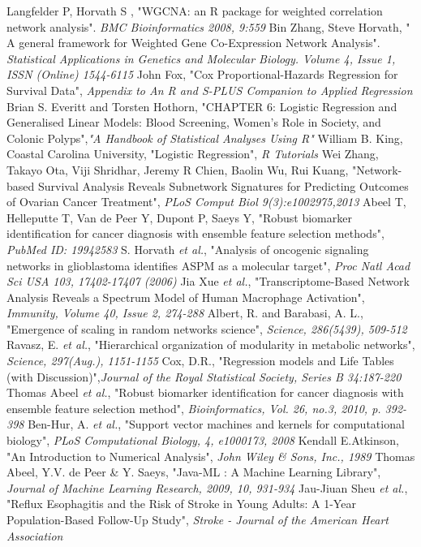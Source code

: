 \documentclass{ba-kecs}
\numberwithin{figure}{section}
\numberwithin{equation}{section}
\begin{document}



\begin{thebibliography}{99}
 Langfelder P, Horvath S , "WGCNA: an R package for weighted correlation network analysis". \emph{BMC Bioinformatics 2008, 9:559}
 Bin Zhang, Steve Horvath, " A general framework for Weighted Gene Co-Expression Network Analysis". \emph{Statistical Applications in Genetics and Molecular Biology. Volume 4, Issue 1, ISSN (Online) 1544-6115}
 John Fox, "Cox Proportional-Hazards Regression for Survival Data", \emph{Appendix to An R and S-PLUS Companion to Applied Regression}
 Brian S. Everitt and Torsten Hothorn, "CHAPTER 6: Logistic Regression and Generalised Linear Models: Blood Screening, Women’s Role in Society, and Colonic Polyps",\emph{"A Handbook of Statistical Analyses Using R"}
 William B. King, Coastal Carolina University, "Logistic Regression", \emph{R Tutorials} 
 Wei Zhang, Takayo Ota, Viji Shridhar, Jeremy R Chien, Baolin Wu, Rui Kuang, "Network-based Survival Analysis Reveals Subnetwork Signatures for Predicting Outcomes of Ovarian Cancer Treatment", \emph{PLoS Comput Biol 9(3):e1002975,2013}
 Abeel T, Helleputte T, Van de Peer Y, Dupont P, Saeys Y, "Robust biomarker identification for cancer diagnosis with ensemble feature selection methods", \emph{PubMed ID: 19942583}
 S. Horvath \emph{et al.}, "Analysis of oncogenic signaling networks in glioblastoma identifies ASPM as a molecular target", \emph{Proc Natl Acad Sci USA 103, 17402-17407 (2006)}
 Jia Xue \emph{et al.}, "Transcriptome-Based Network Analysis Reveals a Spectrum Model of Human Macrophage Activation", \emph{Immunity, Volume 40, Issue 2, 274-288}
 Albert, R. and Barabasi, A. L., "Emergence of scaling in random networks science", \emph{Science, 286(5439), 509-512}
 Ravasz, E. \emph{et al.}, "Hierarchical organization of modularity in metabolic networks", \emph{Science, 297(Aug.), 1151-1155}
 Cox, D.R., "Regression models and Life Tables (with Discussion)",\emph{Journal of the Royal Statistical Society, Series B 34:187-220}
 Thomas Abeel \emph{et al.}, "Robust biomarker identification for cancer diagnosis with ensemble feature selection method", \emph{Bioinformatics, Vol. 26, no.3, 2010, p. 392-398}
 Ben-Hur, A. \emph{et al.}, "Support vector machines and kernels for computational biology", \emph{PLoS Computational Biology, 4, e1000173, 2008}
 Kendall E.Atkinson, "An Introduction to Numerical Analysis", \emph{John Wiley \& Sons, Inc., 1989}
 Thomas Abeel, Y.V. de Peer \& Y. Saeys, "Java-ML : A Machine Learning Library", \emph{Journal of Machine Learning Research, 2009, 10, 931-934}
 Jau-Jiuan Sheu \emph{et al.}, "Reflux Esophagitis and the Risk of Stroke in Young Adults: A 1-Year Population-Based Follow-Up Study", \emph{Stroke - Journal of the American Heart Association}
\end{thebibliography}

\appendix
\end{document}
